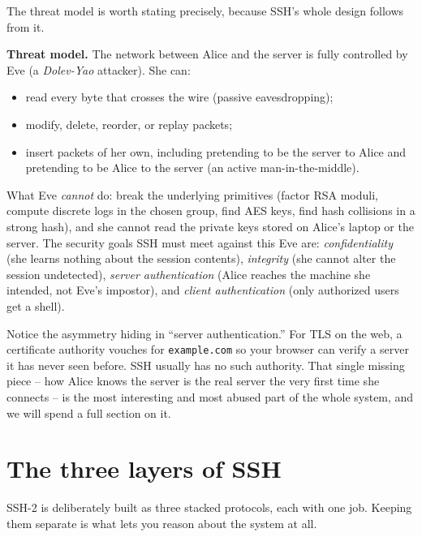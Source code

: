 The threat model is worth stating precisely, because SSH's whole design follows from it.

\begin{focusbox}
\textbf{Threat model.} The network between Alice and the server is fully controlled by Eve (a \emph{Dolev-Yao} attacker). She can:
\begin{itemize}
  \item read every byte that crosses the wire (passive eavesdropping);
  \item modify, delete, reorder, or replay packets;
  \item insert packets of her own, including pretending to be the server to Alice and pretending to be Alice to the server (an active man-in-the-middle).
\end{itemize}
What Eve \emph{cannot} do: break the underlying primitives (factor RSA moduli, compute discrete logs in the chosen group, find AES keys, find hash collisions in a strong hash), and she cannot read the private keys stored on Alice's laptop or the server. The security goals SSH must meet against this Eve are: \emph{confidentiality} (she learns nothing about the session contents), \emph{integrity} (she cannot alter the session undetected), \emph{server authentication} (Alice reaches the machine she intended, not Eve's impostor), and \emph{client authentication} (only authorized users get a shell).
\end{focusbox}

Notice the asymmetry hiding in ``server authentication.'' For TLS on the web, a certificate authority vouches for \texttt{example.com} so your browser can verify a server it has never seen before. SSH usually has no such authority. That single missing piece -- how Alice knows the server is the real server the very first time she connects -- is the most interesting and most abused part of the whole system, and we will spend a full section on it.

\section{The three layers of SSH}

SSH-2 is deliberately built as three stacked protocols, each with one job. Keeping them separate is what lets you reason about the system at all.


